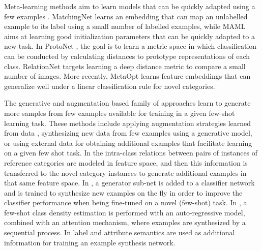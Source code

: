 \documentclass[runningheads]{llncs}
\begin{document}
Meta-learning methods aim to learn models that can be quickly adapted using a few examples \cite{vinyals2016matching,finn2017model,snell2017prototypical,sung2018learning,lee2019meta}. MatchingNet \cite{vinyals2016matching} learns an embedding that can map an unlabelled example to its label using a small number of labelled examples, while MAML \cite{finn2017model} aims at learning good initialization parameters that can be quickly adapted to a new task. In ProtoNet \cite{snell2017prototypical}, the goal is to learn a metric space in which classification can be conducted by calculating distances to prototype representations of each class. RelationNet \cite{sung2018learning} targets learning a deep distance metric to compare a small number of images. More recently, MetaOpt \cite{lee2019meta} learns feature embeddings that can generalize well under a linear classification rule for novel categories.

The generative and augmentation based family of approaches learn to generate more samples from few examples available for training in a given few-shot learning task. These methods include applying augmentation strategies learned from data \cite{lim2019a}, synthesizing new data from few examples using a generative model, or using external data for obtaining additional examples that facilitate learning on a given few shot task. In \cite{Hariharan2017,Schwartz2018} the intra-class relations between pairs of instances of reference categories are modeled in feature space, and then this information is transferred to the novel category instances to generate additional examples in that same feature space. In \cite{Wang2018}, a generator sub-net is added to a classifier network and is trained to synthesize new examples on the fly in order to improve the classifier performance when being fine-tuned on a novel (few-shot) task. In \cite{Reed2018}, a few-shot class density estimation is performed with an auto-regressive model, combined with an attention mechanism, where examples are synthesized by a sequential process. In \cite{Chen2018,Schwartz2019,Yu2017} label and attribute semantics are used as additional information for training an example synthesis network.
\end{document}
